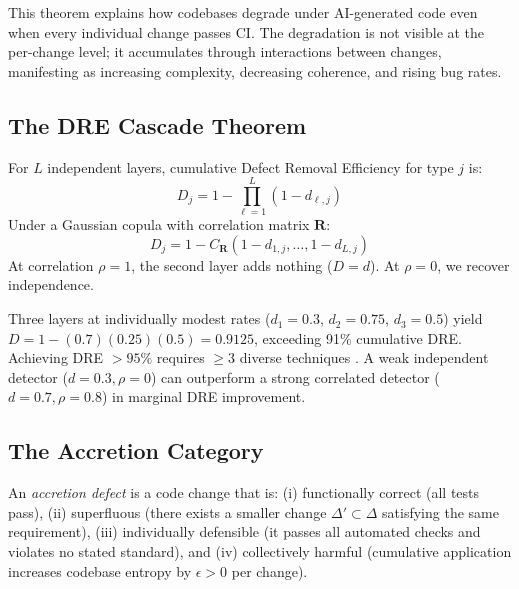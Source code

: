 This theorem explains how codebases degrade under AI-generated code even when every individual change passes CI. The degradation is not visible at the per-change level; it accumulates through interactions between changes, manifesting as increasing complexity, decreasing coherence, and rising bug rates.

\subsection{The DRE Cascade Theorem}

\begin{theorem}
\label{thm:dre-cascade}
For $L$ independent layers, cumulative Defect Removal Efficiency for type $j$ is:
\begin{equation}
D_j = 1 - \prod_{\ell=1}^{L} (1 - d_{\ell,j})
\end{equation}
Under a Gaussian copula with correlation matrix $\mathbf{R}$:
\begin{equation}
D_j = 1 - C_{\mathbf{R}}(1 - d_{1,j}, \ldots, 1 - d_{L,j})
\end{equation}
At correlation $\rho = 1$, the second layer adds nothing ($D = d$). At $\rho = 0$, we recover independence.
\end{theorem}

Three layers at individually modest rates ($d_1 = 0.3$, $d_2 = 0.75$, $d_3 = 0.5$) yield $D = 1 - (0.7)(0.25)(0.5) = 0.9125$, exceeding 91\% cumulative DRE. Achieving DRE $> 95\%$ requires $\geq 3$ diverse techniques \citep{capersjones2012}. A weak independent detector ($d = 0.3, \rho = 0$) can outperform a strong correlated detector ($d = 0.7, \rho = 0.8$) in marginal DRE improvement.

\subsection{The Accretion Category}

\begin{definition}
\label{def:accretion}
An \emph{accretion defect} is a code change that is: (i) functionally correct (all tests pass), (ii) superfluous (there exists a smaller change $\Delta' \subset \Delta$ satisfying the same requirement), (iii) individually defensible (it passes all automated checks and violates no stated standard), and (iv) collectively harmful (cumulative application increases codebase entropy by $\epsilon > 0$ per change).
\end{definition}

